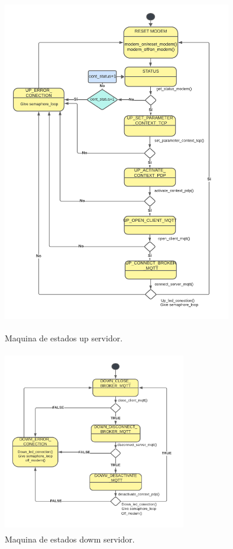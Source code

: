 \begin{figure}[htbp]
  \centering
	\includegraphics[width=10cm, height=15cm]{./Figures/SM up server.png}
	\caption{Maquina de estados up servidor.}
	\label{fig:Maquina de estados up servidor}
\end{figure}

\begin{figure}[htbp]
  \centering
	\includegraphics[width=8cm, height=8cm]{./Figures/SM down server.png}
	\caption{Maquina de estados dowm servidor.}
	\label{fig:Maquina de estados dowm servidor}
\end{figure}



